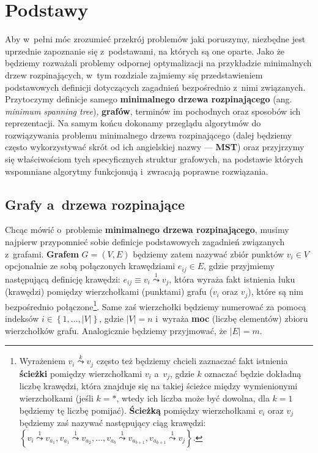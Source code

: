 \chapter{Podstawy}\label{ch:mst}
\thispagestyle{chapterBeginStyle}





Aby w~pełni móc zrozumieć przekrój problemów jaki poruszymy, niezbędne jest uprzednie zapoznanie się z~podstawami, na których są one oparte.
Jako że będziemy rozważali problemy odpornej optymalizacji na przykładzie minimalnych drzew rozpinających, w~tym rozdziale zajmiemy się przedstawieniem podstawowych definicji dotyczących zagadnień bezpośrednio z~nimi związanych.
Przytoczymy definicje samego \textbf{minimalnego drzewa rozpinającego} (ang. \textit{minimum spanning tree}), \textbf{grafów}, terminów im pochodnych oraz sposobów ich reprezentacji.
Na samym końcu dokonamy przeglądu algorytmów do rozwiązywania problemu minimalnego drzewa rozpinającego (dalej będziemy często wykorzystywać skrót od ich angielskiej nazwy --- \textbf{MST}) oraz przyjrzymy się właściwościom tych specyficznych struktur grafowych, na podstawie których wspomniane algorytmy funkcjonują i~zwracają poprawne rozwiązania.




\section{Grafy a~drzewa rozpinające}




Chcąc mówić o~problemie \textbf{minimalnego drzewa rozpinającego}, musimy najpierw przypomnieć sobie definicje podstawowych zagadnień związanych z~grafami.
\textbf{Grafem} $G = \left( V, E \right)$ będziemy zatem nazywać zbiór punktów $v_{i} \in V$ opcjonalnie ze sobą połączonych krawędziami $e_{ij} \in E$, gdzie przyjmiemy następującą definicję krawędzi: $e_{ij} \equiv v_{i} \overset{1}{\leadsto} v_{j}$, która wyraża fakt istnienia łuku (krawędzi) pomiędzy wierzchołkami (punktami) grafu ($v_{i}$ oraz $v_{j}$), które są nim bezpośrednio połączone\footnote{
	Wyrażeniem $v_{i} \overset{k}{\leadsto} v_{j}$ często też będziemy chcieli zaznaczać fakt istnienia \textbf{ścieżki} pomiędzy wierzchołkami $v_{i}$ a~$v_{j}$, gdzie $k$ oznaczać będzie dokładną liczbę krawędzi, która znajduje się na takiej ścieżce między wymienionymi wierzchołkami (jeśli $k = \ast$, wtedy ich liczba może być dowolna, dla $k = 1$ będziemy tę liczbę pomijać). \textbf{Ścieżką} pomiędzy wierzchołkami $v_{i}$ oraz $v_{j}$ będziemy zaś nazywać następujący ciąg krawędzi: $\left\{ v_{i} \overset{1}{\leadsto} v_{a_{1}}, v_{a_{1}} \overset{1}{\leadsto} v_{a_{2}}, \dots, v_{a_{b}} \overset{1}{\leadsto} v_{a_{b+1}}, v_{a_{b+1}} \overset{1}{\leadsto} v_{j}  \right\}$.
}.
Same zaś wierzchołki będziemy numerować za pomocą indeksów $i \in \left\{ 1, \dots, \left| V \right| \right\}$, gdzie $\left| V \right| = n$ i~wyraża \textbf{moc} (liczbę elementów) zbioru wierzchołków grafu.
Analogicznie będziemy przyjmować, że $\left| E \right| = m$. 

